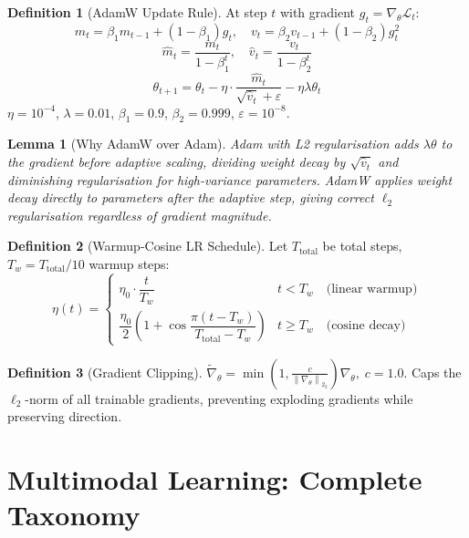 \documentclass[12pt,a4paper]{article}
\theoremstyle{definition}
\newtheorem{definition}{Definition}[section]
\theoremstyle{plain}
\newtheorem{lemma}[theorem]{Lemma}
\theoremstyle{remark}
\newcommand{\Norm}[1]{\left\|#1\right\|_2}
\begin{document}
\begin{definition}[AdamW Update Rule]
At step $t$ with gradient $g_t = \nabla_\theta \mathcal{L}_t$:
\[
  m_t = \beta_1 m_{t-1} + (1-\beta_1)g_t, \quad v_t = \beta_2 v_{t-1} + (1-\beta_2)g_t^2
\]
\[
  \hat{m}_t = \frac{m_t}{1-\beta_1^t}, \quad \hat{v}_t = \frac{v_t}{1-\beta_2^t}
\]
\[
  \boxed{\theta_{t+1} = \theta_t - \eta \cdot \frac{\hat{m}_t}{\sqrt{\hat{v}_t}+\varepsilon} - \eta\lambda\theta_t}
\]
$\eta = 10^{-4}$, $\lambda = 0.01$, $\beta_1 = 0.9$, $\beta_2 = 0.999$, $\varepsilon = 10^{-8}$.
\end{definition}

\begin{lemma}[Why AdamW over Adam]
Adam with L2 regularisation adds $\lambda\theta$ to the gradient before adaptive scaling, dividing weight decay by $\sqrt{\hat{v}_t}$ and diminishing regularisation for high-variance parameters. AdamW applies weight decay directly to parameters after the adaptive step, giving correct $\ell_2$ regularisation regardless of gradient magnitude.
\end{lemma}

\begin{definition}[Warmup-Cosine LR Schedule]
Let $T_{\text{total}}$ be total steps, $T_w = T_{\text{total}}/10$ warmup steps:
\[
  \eta(t) = \begin{cases}
    \eta_0 \cdot \dfrac{t}{T_w} & t < T_w \quad\text{(linear warmup)}\\[6pt]
    \dfrac{\eta_0}{2}\!\left(1+\cos\dfrac{\pi(t-T_w)}{T_{\text{total}}-T_w}\right) & t \ge T_w \quad\text{(cosine decay)}
  \end{cases}
\]
\end{definition}

\begin{definition}[Gradient Clipping]
$\tilde{\nabla}_\theta = \min\!\left(1, \frac{c}{\Norm{\nabla_\theta}_2}\right)\nabla_\theta,\; c = 1.0$. Caps the $\ell_2$-norm of all trainable gradients, preventing exploding gradients while preserving direction.
\end{definition}

\newpage
\section{Multimodal Learning: Complete Taxonomy}
\label{sec:taxonomy}
\end{document}

